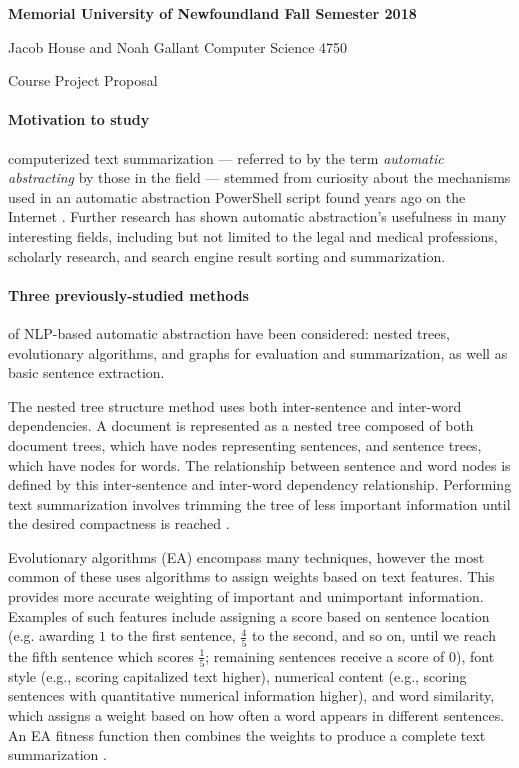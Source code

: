 \documentclass{article}
\begin{document}
	{
		\parindent=0pt
		\bfseries
		Memorial University of Newfoundland \hfill Fall Semester 2018 
		
		Jacob House and Noah Gallant \hfill Computer Science 4750
		
		\vskip 2pc
		
		{
			\Large \hfill Course Project Proposal \hfill
		}
	}

	\vskip 1pc

	\paragraph{Motivation to study} computerized text summarization --- referred to by the term {\em automatic abstracting}  by those in the field --- stemmed from curiosity about the mechanisms used in an automatic abstraction PowerShell script found years ago on the Internet \cite{PSScript}. Further research has shown automatic abstraction's usefulness in many interesting fields, including but not limited to the legal and medical professions, scholarly research, and search engine result sorting and summarization.
	
	
	\paragraph{Three previously-studied methods} of NLP-based automatic abstraction have been considered: nested trees, evolutionary algorithms, and graphs for evaluation and summarization, as well as basic sentence extraction.
	
	The nested tree structure method uses both inter-sentence and inter-word dependencies. A document is represented as a nested tree composed of both document trees, which have nodes representing sentences, and sentence trees, which have nodes for words. The relationship between sentence and word nodes is defined by this inter-sentence and inter-word dependency relationship. Performing text summarization involves trimming the tree of less important information until the desired compactness is reached \cite{art3}.
	
	Evolutionary algorithms (EA) encompass many techniques, however the most common of these uses algorithms to assign weights based on text features. This provides more accurate weighting of important and unimportant information. Examples of such features include assigning a score based on sentence location (e.g. awarding $1$ to the first sentence, $\frac{4}{5}$ to the second, and so on, until we reach the fifth sentence which scores $\frac{1}{5}$; remaining sentences receive a score of $0$), font style (e.g., scoring capitalized text higher), numerical content (e.g., scoring sentences with quantitative numerical information higher), and word similarity, which assigns a weight based on how often a word appears in different sentences. An EA fitness function then combines the weights to produce a complete text summarization \cite{art1}.
	
\end{document}
